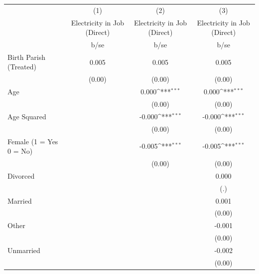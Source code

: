 {
\def\sym#1{\ifmmode^{#1}\else\(^{#1}\)\fi}
\begin{tabular}{l*{3}{c}}
\hline\hline
                    &\multicolumn{1}{c}{(1)}&\multicolumn{1}{c}{(2)}&\multicolumn{1}{c}{(3)}\\
                    &\multicolumn{1}{c}{Electricity in Job (Direct)}&\multicolumn{1}{c}{Electricity in Job (Direct)}&\multicolumn{1}{c}{Electricity in Job (Direct)}\\
                    &        b/se         &        b/se         &        b/se         \\
\hline
Birth Parish (Treated)&       0.005         &       0.005         &       0.005         \\
                    &      (0.00)         &      (0.00)         &      (0.00)         \\
Age                 &                     &       0.000\sym{***}&       0.000\sym{***}\\
                    &                     &      (0.00)         &      (0.00)         \\
Age Squared         &                     &      -0.000\sym{***}&      -0.000\sym{***}\\
                    &                     &      (0.00)         &      (0.00)         \\
Female (1 = Yes 0 = No)&                     &      -0.005\sym{***}&      -0.005\sym{***}\\
                    &                     &      (0.00)         &      (0.00)         \\
Divorced            &                     &                     &       0.000         \\
                    &                     &                     &         (.)         \\
Married             &                     &                     &       0.001         \\
                    &                     &                     &      (0.00)         \\
Other               &                     &                     &      -0.001         \\
                    &                     &                     &      (0.00)         \\
Unmarried           &                     &                     &      -0.002         \\
                    &                     &                     &      (0.00)         \\

\end{tabular}}
